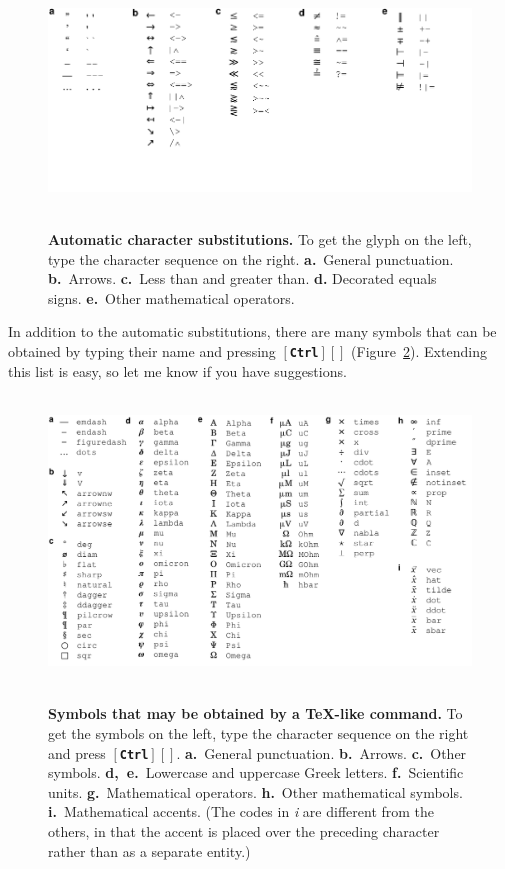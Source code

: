 \documentclass[11pt]{report}
\def\keystroke#1{$\left[\right.\!${\tt\bfseries #1}$\!\left.\right]$}
\def\keycombo#1#2{\keystroke{#1}\keystroke{#2}}
\def\keycontrol#1{\keycombo{Ctrl}{#1}}
\def\keyctrlbackslash{\keycontrol{\char92}}
\begin{document}
\begin{figure}[b]
\noindent~\hfill\includegraphics[scale=.85]{../doc/digraphs.pdf}\hfill~\vspace{-40pt}

\caption{{\bf Automatic character substitutions.} To get the glyph on
  the left, type the character sequence on the right. {\bf a.}~General
  punctuation. {\bf b.}~Arrows. {\bf c.}~Less than and greater
  than. {\bf d.} Decorated equals signs. {\bf e.}~Other mathematical
  operators.}\label{fig:charsubst}
\end{figure}

In addition to the automatic substitutions, there are many symbols
that can be obtained by typing their name and pressing
\keyctrlbackslash{} (Figure~\ref{fig:texcodes}).  Extending this list
is easy, so let me know if you have suggestions.

\begin{figure}
\noindent~\hfill\includegraphics[scale=.85]{../doc/texcodes.pdf}\hfill~\vspace{-7pt}

\caption{{\bf Symbols that may be obtained by a TeX-like command.} To
  get the symbols on the left, type the character sequence on the
  right and press \keyctrlbackslash.  {\bf a.}~General
  punctuation. {\bf b.}~Arrows. {\bf c.}~Other symbols. {\bf
    d,~e.}~Lowercase and uppercase Greek letters. {\bf f.}~Scientific
  units. {\bf g.}~Mathematical operators. {\bf h.}~Other mathematical
  symbols. {\bf i.}~Mathematical accents. (The codes in \emph{i} are
  different from the others, in that the accent is placed over the
  preceding character rather than as a separate
  entity.)}\label{fig:texcodes}
\end{figure}
\end{document}
